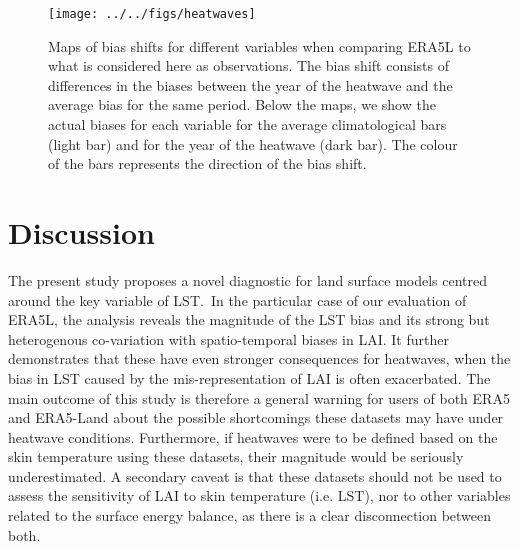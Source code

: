 \documentclass[gmd, manuscript]{copernicus}
\begin{document}
{\par\null{}
\begin{figure}[H]
\begin{center}
\texttt{[image: ../../figs/heatwaves]}
\caption{{Maps of bias shifts for different variables when comparing ERA5L to what
is considered here as observations. The bias shift consists of
differences in the biases between the year of the heatwave and the
average bias for the same period. Below the maps, we show the actual
biases for each variable for the average climatological bars (light bar)
and for the year of the heatwave (dark bar). The colour of the bars
represents the direction of the bias shift.
{\label{116908}}%
}}
\end{center}
\end{figure}



\section{Discussion}

The present study proposes a novel diagnostic for land surface models
centred around the key variable of LST.~In the particular case of our
evaluation of ERA5L, the analysis reveals the magnitude of the LST bias
and its strong but heterogenous co-variation with spatio-temporal biases
in LAI. It further demonstrates that these have even stronger
consequences for heatwaves, when the bias in LST caused by the
mis-representation of LAI is often exacerbated. The main outcome of this 
study is therefore a general warning for users of both ERA5 and ERA5-Land 
about the possible shortcomings these datasets may have under heatwave 
conditions. Furthermore, if heatwaves were to be defined based on the skin 
temperature using these datasets, their magnitude would be seriously 
underestimated. A secondary caveat is that these datasets should not be used
to assess the sensitivity of LAI to skin temperature (i.e. LST), nor 
to other variables related to the surface energy balance, as there is a 
clear disconnection between both.

}
\end{document}
